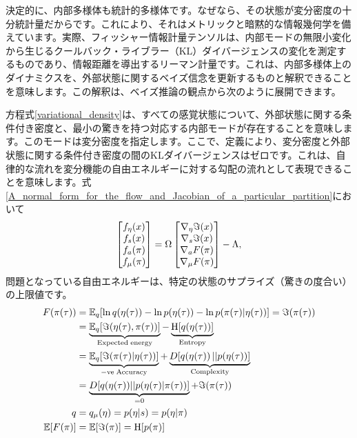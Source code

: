 \documentclass[a4paper, titlepage]{jsarticle}
\begin{document}
決定的に、内部多様体も統計的多様体です。なぜなら、その状態が変分密度の十分統計量だからです。これにより、それはメトリックと暗黙的な情報幾何学を備えています。実際、フィッシャー情報計量テンソルは、内部モードの無限小変化から生じるクールバック・ライブラー（KL）ダイバージェンスの変化を測定するものであり、情報距離を導出するリーマン計量です。これは、内部多様体上のダイナミクスを、外部状態に関するベイズ信念を更新するものと解釈できることを意味します。この解釈は、ベイズ推論の観点から次のように展開できます。
\par
方程式\eqref{variational_density}は、すべての感覚状態について、外部状態に関する条件付き密度と、最小の驚きを持つ対応する内部モードが存在することを意味します。このモードは変分密度を指定します。ここで、定義により、変分密度と外部状態に関する条件付き密度の間のKLダイバージェンスはゼロです。これは、自律的な流れを変分機能の自由エネルギーに対する勾配の流れとして表現できることを意味します。式\eqref{A_normal_form_for_the_flow_and_Jacobian_of_a_particular_partition}において
\begin{equation}\label{17}
    \begin{bmatrix}
        f_{\eta}(x) \\
        f_{s}(x) \\
        f_{a}(\pi) \\
        f_{\mu}(\pi)
    \end{bmatrix}
    =\Omega\begin{bmatrix}
        \nabla_{\eta}\imaginary(x) \\
        \nabla_{s}\imaginary(x) \\
        \nabla_{a}F(\pi) \\
        \nabla_{\mu}F(\pi)
    \end{bmatrix}-\Lambda,
\end{equation}
問題となっている自由エネルギーは、特定の状態のサプライズ（驚きの度合い）の上限値です。
\begin{equation}
    \begin{aligned}
        F(\pi(\tau)) &= \mathbb{E}_q[\ln q(\eta(\tau)) - \ln p(\eta(\tau)) - \ln p(\pi(\tau) | \eta(\tau))]=\imaginary(\pi(\tau)) \\
        &=\underbrace{\mathbb{E}_q\qty[\imaginary\qty(\eta(\tau),\pi(\tau))]}_{\mathrm{Expected\;energy}}-\underbrace{\mathrm{H}\qty[q\qty(\eta(\tau))]}_{\mathrm{Entropy}} \\
        &=\underbrace{\mathbb{E}_q\qty[\imaginary\qty(\pi(\tau)|\eta(\tau))]}_{\mathrm{-ve\;Accuracy}}+\underbrace{D\qty[q\qty(\eta(\tau))||p\qty(\eta(\tau))]}_\mathrm{Complexity} \\
        &=\underbrace{D[q(\eta(\tau)) || p(\eta(\tau) | \pi(\tau))]}_{=0} + \imaginary(\pi(\tau)) \\
        q&=q_{\mu}(\eta) = p(\eta | s) = p(\eta | \pi) \\
        \mathbb{E}[F(\pi)] &= \mathbb{E}[\imaginary(\pi)] = \mathrm{H}[p(\pi)]
    \end{aligned}
\end{equation}
\end{document}
